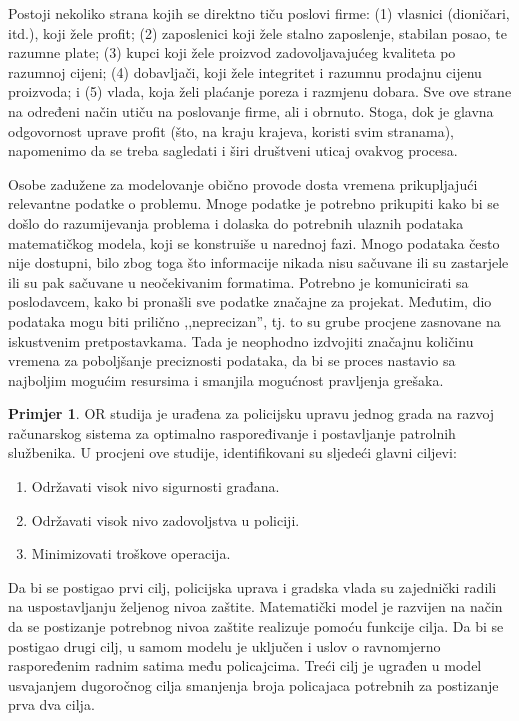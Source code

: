 \documentclass[a4paper, utf8, 11pt, colorlinks]{book}
\theoremstyle{definition}
\newtheorem{primjer}{Primjer}[chapter]
\begin{document}
Postoji nekoliko strana kojih se direktno tiču poslovi firme: (1) vlasnici (dioničari, itd.), koji žele profit;   (2) zaposlenici koji žele stalno zaposlenje, stabilan posao, te razumne plate; (3) kupci koji žele proizvod zadovoljavajućeg kvaliteta po razumnoj cijeni;
(4) dobavljači, koji žele integritet i razumnu prodajnu cijenu proizvoda; i
(5) vlada, koja želi plaćanje poreza i razmjenu dobara. Sve ove strane na određeni način utiču na poslovanje firme, ali i obrnuto.  Stoga, dok je glavna odgovornost uprave profit (što, na kraju krajeva, koristi svim stranama), napomenimo da se treba sagledati i širi društveni uticaj ovakvog procesa. 
 
 Osobe zadužene za modelovanje obično provode dosta vremena prikupljajući relevantne podatke o problemu. Mnoge podatke je potrebno prikupiti kako bi se došlo do razumijevanja problema i dolaska do potrebnih ulaznih podataka matematičkog modela, koji se konstruiše u narednoj fazi.  Mnogo  podataka često nije dostupni, bilo zbog toga što informacije nikada nisu sačuvane ili su zastarjele ili su pak sačuvane u neočekivanim formatima. Potrebno je komunicirati sa poslodavcem, kako bi pronašli sve podatke značajne za projekat. Međutim, dio podataka mogu biti prilično ,,neprecizan'', tj. to su grube procjene zasnovane na iskustvenim pretpostavkama. Tada je neophodno izdvojiti značajnu količinu vremena za poboljšanje  
preciznosti podataka, da bi se proces nastavio sa najboljim mogućim resursima i smanjila mogućnost pravljenja grešaka. 

\begin{primjer}
 OR studija je urađena za policijsku upravu jednog grada %
na razvoj računarskog sistema za optimalno raspoređivanje i postavljanje patrolnih službenika. U procjeni   ove studije, identifikovani su sljedeći glavni ciljevi:
\begin{enumerate}
    \item  Održavati visok nivo sigurnosti građana.
    \item  Održavati visok nivo zadovoljstva u policiji.
     \item Minimizovati troškove operacija.
\end{enumerate}
Da bi se postigao prvi cilj, policijska uprava i gradska vlada  su zajednički radili na uspostavljanju željenog nivoa zaštite.  Matematički model je razvijen na način da se postizanje potrebnog nivoa zaštite realizuje pomoću funkcije cilja.  Da bi se postigao drugi cilj, u samom modelu je uključen i uslov o ravnomjerno raspoređenim radnim satima među policajcima. Treći cilj je ugrađen u model usvajanjem dugoročnog cilja smanjenja broja policajaca potrebnih za postizanje prva dva cilja. 
\end{primjer}
\end{document}
